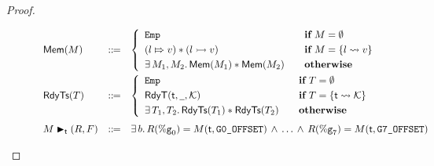 \begin{proof}
\begin{enumerate}
        \begin{figure}[!t]
            \centering
            \[
                \begin{array}{lcl}
                    \centering
                    \MemRAsrt{\Mem} & \define & 
                    \left\{
                        \begin{array}{ll}
                            \empAst & \quad \cif \ \Mem = \emptyset \\
                            \\[-9pt]
                            (\relmsto{\loc}{\val}) \sepstar (\hmsto{\loc}{\val}) 
                            & \quad \cif \ \Mem = \{ \loc \rightsquigarrow \val \} \\
                            \\[-9pt]
                            \exists \, \Mem_1, \Mem_2. \,
                            \MemRAsrt{\Mem_1} \sepstar \MemRAsrt{\Mem_2}
                            & \quad \otherwise
                        \end{array}
                    \right. \\
                    \\[-8pt]
                    \RdyTsRAsrt{\thrdpool} & \define & 
                    \left\{
                        \begin{array}{ll}
                            \empAst & \quad \cif \ \thrdpool = \emptyset \\
                            \\[-9pt]
                            \RelRdyT{\thrdid}{\notCare}{\hthrdlocalst} & 
                            \quad \cif \ \thrdpool = \{ \thrdid \rightsquigarrow \hthrdlocalst \} \\
                            \\[-9pt]
                            \exists \, \thrdpool_1, \thrdpool_2. \, 
                            \RdyTsRAsrt{\thrdpool_1} \sepstar \RdyTsRAsrt{\thrdpool_2} & 
                            \quad \otherwise 
                        \end{array}
                    \right. \\
                    \\[-5pt]
                    \restoreCtx{\Mem}{\thrdid}{(\RFile, \Wstack)} & \define & 
                    \exists \, \block. \, 
                    \RFile(\greg{0}) = \Mem(\thrdid, \ofsGOne) \, \land \, \dots \, \land \, 
                    \RFile(\greg{7}) = \Mem(\thrdid, \ofsGEig) \\

\end{array}\]
\end{figure}
\end{enumerate}
\end{proof}
